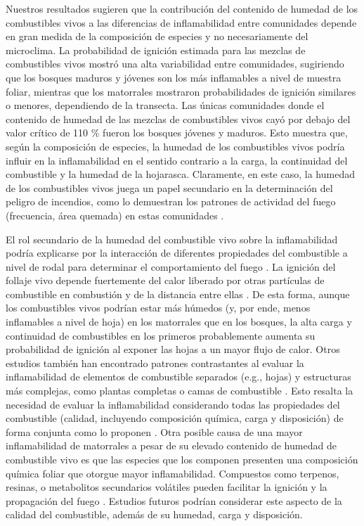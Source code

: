 Nuestros resultados sugieren que la contribución del contenido de humedad de los combustibles vivos a las diferencias de inflamabilidad entre comunidades depende en gran medida de la composición de especies y no necesariamente del microclima. La probabilidad de ignición estimada para las mezclas de combustibles vivos mostró una alta variabilidad entre comunidades, sugiriendo que los bosques maduros y jóvenes son los más inflamables a nivel de muestra foliar, mientras que los matorrales mostraron probabilidades de ignición similares o menores, dependiendo de la transecta. Las únicas comunidades donde el contenido de humedad de las mezclas de combustibles vivos cayó por debajo del valor crítico de 110 \% fueron los bosques jóvenes y maduros. Esto muestra que, según la composición de especies, la humedad de los combustibles vivos podría influir en la inflamabilidad en el sentido contrario a la carga, la continuidad del combustible y la humedad de la hojarasca. Claramente, en este caso, la humedad de los combustibles vivos juega un papel secundario en la determinación del peligro de incendios, como lo demuestran los patrones de actividad del fuego (frecuencia, área quemada) en estas comunidades \citep{mermoz_landscape_2005, morales_stochastic_2015, paritsis_positive_2015, tiribelli_non-additive_2019}.

El rol secundario de la humedad del combustible vivo sobre la inflamabilidad podría explicarse por la interacción de diferentes propiedades del combustible a nivel de rodal para determinar el comportamiento del fuego \citep{fernandes_plant_2012, zylstra_biophysical_2016}. La ignición del follaje vivo depende fuertemente del calor liberado por otras partículas de combustible en combustión y de la distancia entre ellas \citep{zylstra_biophysical_2016}. De esta forma, aunque los combustibles vivos podrían estar más húmedos (y, por ende, menos inflamables a nivel de hoja) en los matorrales que en los bosques, la alta carga y continuidad de combustibles en los primeros probablemente aumenta su probabilidad de ignición al exponer las hojas a un mayor flujo de calor. Otros estudios también han encontrado patrones contrastantes al evaluar la inflamabilidad de elementos de combustible separados (e.g., hojas) y estructuras más complejas, como plantas completas o camas de combustible \citep{fernandes_plant_2012}. Esto resalta la necesidad de evaluar la inflamabilidad considerando todas las propiedades del combustible (calidad, incluyendo composición química, carga y disposición) de forma conjunta como lo proponen \citet{zylstra_biophysical_2016}. Otra posible causa de una mayor inflamabilidad de matorrales a pesar de su elevado contenido de humedad de combustible vivo es que las especies que los componen presenten una composición química foliar que otorgue mayor inflamabilidad. Compuestos como terpenos, resinas, o metabolitos secundarios volátiles pueden facilitar la ignición y la propagación del fuego \citep{alessio_influence_2008, guerrero_unraveling_2024}. Estudios futuros podrían considerar este aspecto de la calidad del combustible, además de su humedad, carga y disposición.

